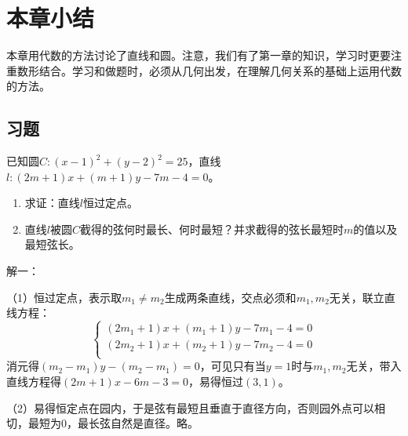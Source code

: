 \section{本章小结}

本章用代数的方法讨论了直线和圆。注意，我们有了第一章的知识，学习时更要注重数形结合。学习和做题时，必须从几何出发，在理解几何关系的基础上运用代数的方法。

\subsection{习题}

\begin{example}
已知圆$C:\left( x-1 \right) ^2+\left( y-2 \right) ^2=25$，直线$l:\left( 2m+1 \right) x+\left( m+1 \right) y-7m-4=0$。
\begin{enumerate}
    \item 求证：直线$l$恒过定点。
    \item 直线$l$被圆$C$截得的弦何时最长、何时最短？并求截得的弦长最短时$m$的值以及最短弦长。
\end{enumerate}
\end{example}

解一：

（1）恒过定点，表示取$m_1\ne m_2$生成两条直线，交点必须和$m_1,m_2$无关，联立直线方程：
\[
\begin{cases}
	\left( 2m_1+1 \right) x+\left( m_1+1 \right) y-7m_1-4=0\\
	\left( 2m_2+1 \right) x+\left( m_2+1 \right) y-7m_2-4=0\\
\end{cases}
\]
消元得$\left( m_2-m_1 \right) y-\left( m_2-m_1 \right) =0$，可见只有当$y=1$时与$m_1,m_2$无关，带入直线方程得$\left( 2m+1 \right) x-6m-3=0$，易得恒过$\left( 3,1 \right) $。

（2）易得恒定点在园内，于是弦有最短且垂直于直径方向，否则园外点可以相切，最短为0，最长弦自然是直径。略。

\begin{figure}[h]
\centering
{}
\end{figure}


